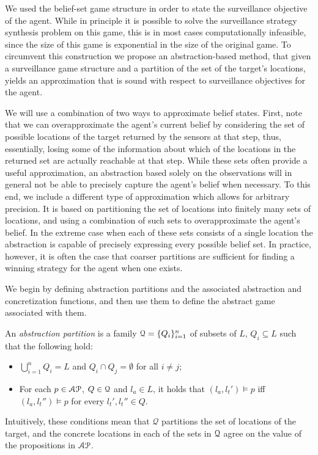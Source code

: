 We used the belief-set game structure in order to state the surveillance objective of the agent. While in principle it is possible to solve the surveillance strategy synthesis problem on this game, this is in most cases computationally infeasible, since the size of this game is exponential in the size of the original game. To circumvent this construction we propose an abstraction-based method, that given a surveillance game structure and a partition of the set of the target's locations, yields an approximation that is sound with respect to surveillance objectives for the agent.

We will use a combination of two ways to approximate belief states. First, note that we can overapproximate the agent's current belief by considering the set of possible locations of the target returned by the sensors at that step, thus, essentially, losing some of the information about which of the locations in the returned set are actually reachable at that step. While these sets often provide a useful approximation, an abstraction based solely on the observations will in general not be able to precisely capture the agent's belief when necessary. To this end, we include a different type of approximation which allows for arbitrary precision. It is based on partitioning the set of locations into finitely many sets of locations, and using a combination of such sets to overapproximate the agent's belief. In the extreme case when each of these sets consists of a single location the abstraction is capable of precisely expressing every possible belief set. In practice, however, it is often the case that coarser partitions are sufficient for finding a winning strategy for the agent when one exists.

We begin by defining abstraction partitions and the associated abstraction and concretization functions, and then use them to define the abstract game associated with them.

\bigskip
An \emph{abstraction partition} is a family $\mathcal{Q} = \{Q_i\}_{i=1}^n$ of subsets of $L$, $Q_i \subseteq L$ such that the following hold:
\begin{itemize}
\item $\bigcup_{i=1}^n Q_i = L$ and $Q_i \cap Q_j = \emptyset$ for all $i \neq j$;
\item For each $p \in \mathcal{AP}$, $Q \in \mathcal{Q}$ and $l_a \in L$, it holds that $(l_a,l_t') \models p$ iff $(l_a,l_t'') \models p$ for every $l_t',l_t'' \in Q$.
\end{itemize}
Intuitively, these conditions mean that $\mathcal Q$ partitions the set of locations of the target, and the concrete locations in each of the sets in $\mathcal{Q}$ agree on the value of the  propositions in $\mathcal{AP}$.

